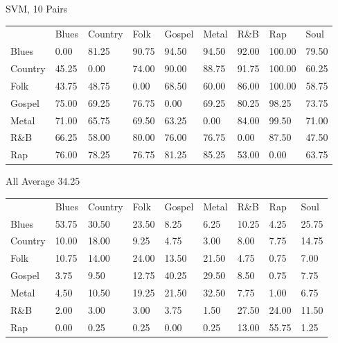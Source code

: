 \documentclass[a4paper,oneside]{article}
\begin{document}
SVM, 10
Pairs
\begin{table}
\begin{tabular}{|l||*{8}{l|}} \hline
 & Blues & Country & Folk & Gospel & Metal & R\&B & Rap & Soul \\ \hhline{|=||*{8}{=|}}
Blues & 0.00 & 81.25 & 90.75 & 94.50 & 94.50 & 92.00 & 100.00 & 79.50 \\ \hline
Country & 45.25 & 0.00 & 74.00 & 90.00 & 88.75 & 91.75 & 100.00 & 60.25 \\ \hline
Folk & 43.75 & 48.75 & 0.00 & 68.50 & 60.00 & 86.00 & 100.00 & 58.75 \\ \hline
Gospel & 75.00 & 69.25 & 76.75 & 0.00 & 69.25 & 80.25 & 98.25 & 73.75 \\ \hline
Metal & 71.00 & 65.75 & 69.50 & 63.25 & 0.00 & 84.00 & 99.50 & 71.00 \\ \hline
R\&B & 66.25 & 58.00 & 80.00 & 76.00 & 76.75 & 0.00 & 87.50 & 47.50 \\ \hline
Rap & 76.00 & 78.25 & 76.75 & 81.25 & 85.25 & 53.00 & 0.00 & 63.75 \\ \hline
\end{tabular}
\end{table}

All
Average 34.25
\begin{table}
\begin{tabular}{|l||*{8}{l|}} \hline
 & Blues & Country & Folk & Gospel & Metal & R\&B & Rap & Soul \\ \hhline{|=||*{8}{=|}}
Blues & 53.75 & 30.50 & 23.50 & 8.25 & 6.25 & 10.25 & 4.25 & 25.75 \\ \hline
Country & 10.00 & 18.00 & 9.25 & 4.75 & 3.00 & 8.00 & 7.75 & 14.75 \\ \hline
Folk & 10.75 & 14.00 & 24.00 & 13.50 & 21.50 & 4.75 & 0.75 & 7.00 \\ \hline
Gospel & 3.75 & 9.50 & 12.75 & 40.25 & 29.50 & 8.50 & 0.75 & 7.75 \\ \hline
Metal & 4.50 & 10.50 & 19.25 & 21.50 & 32.50 & 7.75 & 1.00 & 6.75 \\ \hline
R\&B & 2.00 & 3.00 & 3.00 & 3.75 & 1.50 & 27.50 & 24.00 & 11.50 \\ \hline
Rap & 0.00 & 0.25 & 0.25 & 0.00 & 0.25 & 13.00 & 55.75 & 1.25 \\ \hline
\end{tabular}
\end{table}
\end{document}
